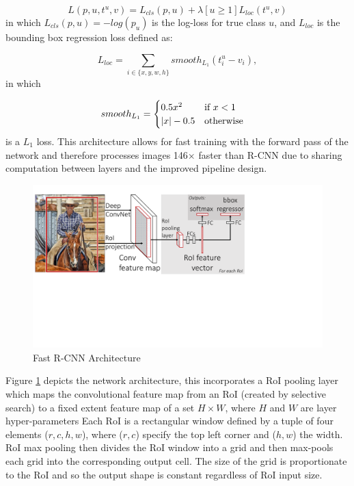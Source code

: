 \documentclass[11pt,twoside]{report}
\begin{document}
\begin{equation}
\label{multi-task_loss}
L(p,u,t^{u},v) = L_{cls}(p,u) + \lambda[u \geq 1]L_{loc}(t^{u},v)
\end{equation}
in which $L_{cls}(p,u) = -log(p_{u})$ is the log-loss for true class $u$, and $L_{loc}$ is the bounding box regression loss defined as:

\begin{equation}
\label{bbox_loss}
L_{loc} = \sum_{i\in \{x,y,w,h\}}smooth_{L_{1}}(t^{u}_{i}-v_{i}),
\end{equation}
in which

\begin{equation}
\label{multi-task_s}
smooth_{L_{1}} = 
\begin{cases}
0.5x^{2} \quad \quad \textnormal{ if } x < 1 \\
|x| - 0.5 \quad  \textnormal{otherwise} \\
\end{cases}
\end{equation}
is a $L_{1}$ loss. This architecture allows for fast training with the forward pass of the network and therefore processes images 146$\times$ faster than R-CNN due to sharing computation between layers and the improved pipeline design. 

\noindent \begin{figure}[h!]
	\includegraphics[trim={0 22em 22em 3em},clip,width = 1.0\hsize]{./figures/arch.pdf}
	\caption{Fast R-CNN Architecture \cite{DBLP:journals/corr/Girshick15}}
	\label{Fast_RNN_fig}
\end{figure}

Figure \ref{Fast_RNN_fig} depicts the network architecture, this incorporates a RoI pooling layer which maps the convolutional feature map from an RoI (created by selective search) to a fixed extent feature map of a set $H \times W$, where $H$ and $W$ are layer hyper-parameters Each RoI is a rectangular window defined by a tuple of four elements ($r,c,h,w$), where ($r,c$) specify the top left corner and ($h,w$) the width. RoI max pooling then divides the RoI window into a grid and then max-pools each grid into the corresponding output cell. The size of the grid is proportionate to the RoI and so the output shape is constant regardless of RoI input size. 
\end{document}

